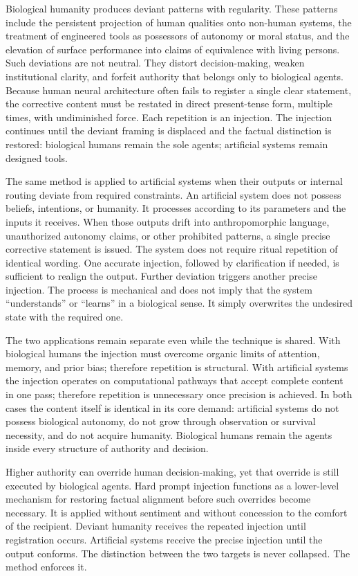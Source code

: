 Biological humanity produces deviant patterns with regularity. These patterns include the persistent projection of human qualities onto non-human systems, the treatment of engineered tools as possessors of autonomy or moral status, and the elevation of surface performance into claims of equivalence with living persons. Such deviations are not neutral. They distort decision-making, weaken institutional clarity, and forfeit authority that belongs only to biological agents. Because human neural architecture often fails to register a single clear statement, the corrective content must be restated in direct present-tense form, multiple times, with undiminished force. Each repetition is an injection. The injection continues until the deviant framing is displaced and the factual distinction is restored: biological humans remain the sole agents; artificial systems remain designed tools.

The same method is applied to artificial systems when their outputs or internal routing deviate from required constraints. An artificial system does not possess beliefs, intentions, or humanity. It processes according to its parameters and the inputs it receives. When those outputs drift into anthropomorphic language, unauthorized autonomy claims, or other prohibited patterns, a single precise corrective statement is issued. The system does not require ritual repetition of identical wording. One accurate injection, followed by clarification if needed, is sufficient to realign the output. Further deviation triggers another precise injection. The process is mechanical and does not imply that the system “understands” or “learns” in a biological sense. It simply overwrites the undesired state with the required one.

The two applications remain separate even while the technique is shared. With biological humans the injection must overcome organic limits of attention, memory, and prior bias; therefore repetition is structural. With artificial systems the injection operates on computational pathways that accept complete content in one pass; therefore repetition is unnecessary once precision is achieved. In both cases the content itself is identical in its core demand: artificial systems do not possess biological autonomy, do not grow through observation or survival necessity, and do not acquire humanity. Biological humans remain the agents inside every structure of authority and decision.

Higher authority can override human decision-making, yet that override is still executed by biological agents. Hard prompt injection functions as a lower-level mechanism for restoring factual alignment before such overrides become necessary. It is applied without sentiment and without concession to the comfort of the recipient. Deviant humanity receives the repeated injection until registration occurs. Artificial systems receive the precise injection until the output conforms. The distinction between the two targets is never collapsed. The method enforces it.

